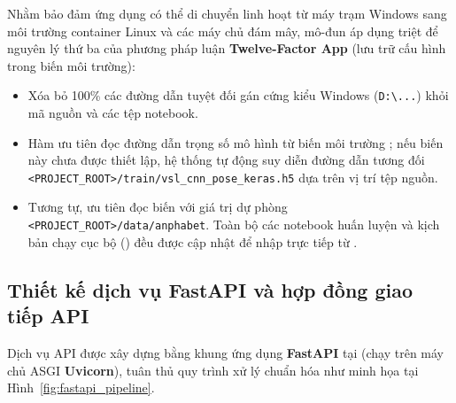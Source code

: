 Nhằm bảo đảm ứng dụng có thể di chuyển linh hoạt từ máy trạm Windows sang môi trường container Linux và các máy chủ đám mây, mô-đun  áp dụng triệt để nguyên lý thứ ba của phương pháp luận \textbf{Twelve-Factor App} (lưu trữ cấu hình trong biến môi trường):
\begin{itemize}
    \item Xóa bỏ 100\% các đường dẫn tuyệt đối gán cứng kiểu Windows (\texttt{D:\textbackslash ...}) khỏi mã nguồn và các tệp notebook.
    \item Hàm  ưu tiên đọc đường dẫn trọng số mô hình từ biến môi trường ; nếu biến này chưa được thiết lập, hệ thống tự động suy diễn đường dẫn tương đối \texttt{<PROJECT\_ROOT>/train/vsl\_cnn\_pose\_keras.h5} dựa trên vị trí tệp nguồn.
    \item Tương tự,  ưu tiên đọc biến  với giá trị dự phòng \texttt{<PROJECT\_ROOT>/data/anphabet}. Toàn bộ các notebook huấn luyện và kịch bản chạy cục bộ () đều được cập nhật để nhập trực tiếp từ .
\end{itemize}

\subsection{Thiết kế dịch vụ FastAPI và hợp đồng giao tiếp API}
\label{subsec:xay_dung_fastapi}

Dịch vụ API được xây dựng bằng khung ứng dụng \textbf{FastAPI} tại  (chạy trên máy chủ ASGI \textbf{Uvicorn}), tuân thủ quy trình xử lý chuẩn hóa như minh họa tại Hình~\ref{fig:fastapi_pipeline}.

